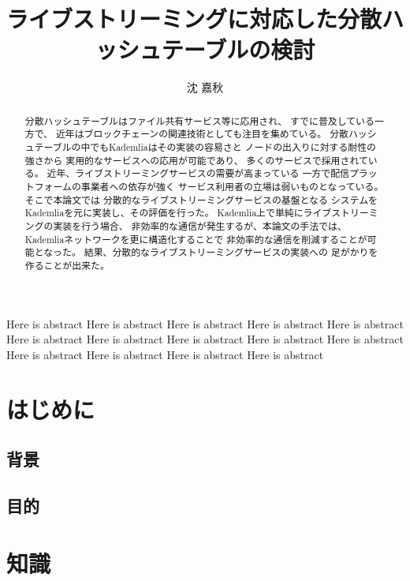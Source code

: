 \documentclass[sotsuron]{jcsie}
\title{ライブストリーミングに対応した分散ハッシュテーブルの検討}
\author{沈 嘉秋}
\begin{document}
\maketitle
\emaketitle
{}
\begin{abstract}    
  分散ハッシュテーブルはファイル共有サービス等に応用され、
  すでに普及している一方で、
  近年はブロックチェーンの関連技術としても注目を集めている。
  分散ハッシュテーブルの中でもKademliaはその実装の容易さと
  ノードの出入りに対する耐性の強さから
  実用的なサービスへの応用が可能であり、
  多くのサービスで採用されている。
  近年、ライブストリーミングサービスの需要が高まっている
  一方で配信プラットフォームの事業者への依存が強く
  サービス利用者の立場は弱いものとなっている。
  そこで本論文では
  分散的なライブストリーミングサービスの基盤となる
  システムをKademliaを元に実装し、その評価を行った。
  Kademlia上で単純にライブストリーミングの実装を行う場合、
  非効率的な通信が発生するが、本論文の手法では、
  Kademliaネットワークを更に構造化することで
  非効率的な通信を削減することが可能となった。
  結果、分散的なライブストリーミングサービスの実装への
  足がかりを作ることが出来た。
\end{abstract}
\begin{eabstract}
  Here is abstract
  Here is abstract
  Here is abstract
  Here is abstract
  Here is abstract
  Here is abstract
  Here is abstract
  Here is abstract
  Here is abstract
  Here is abstract
  Here is abstract
  Here is abstract
  Here is abstract
  Here is abstract
\end{eabstract}
\tableofcontents
{}
\chapter{はじめに}
\section{背景}
\section{目的}
\chapter{知識}
\begin{acknowledgment}
\end{acknowledgment}
\nocite{*}


\end{document}
